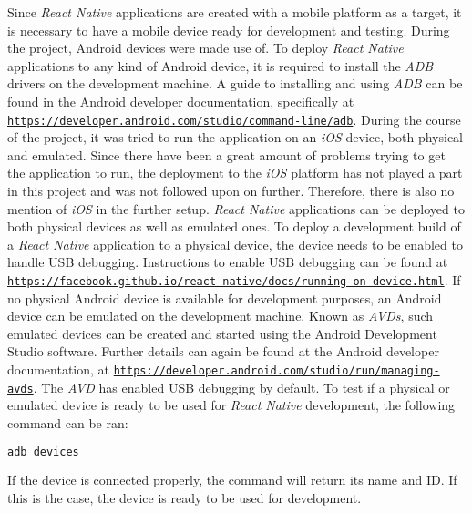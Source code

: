 Since \textit{React Native} applications are created with a mobile platform as a target, it is necessary to have a mobile device ready for development and testing. During the project, Android devices were made use of. To deploy \textit{React Native} applications to any kind of Android device, it is required to install the \textit{ADB} drivers on the development machine. A guide to installing and using \textit{ADB} can be found in the Android developer documentation, specifically at \href{https://developer.android.com/studio/command-line/adb}{\nolinkurl{https://developer.android.com/studio/command-line/adb}}.
\newline
During the course of the project, it was tried to run the application on an \textit{iOS} device, both physical and emulated. Since there have been a great amount of problems trying to get the application to run, the deployment to the \textit{iOS} platform has not played a part in this project and was not followed upon on further. Therefore, there is also no mention of \textit{iOS} in the further setup.
\newline
\textit{React Native} applications can be deployed to both physical devices as well as emulated ones. To deploy a development build of a \textit{React Native} application to a physical device, the device needs to be enabled to handle USB debugging. Instructions to enable USB debugging can be found at \href{https://facebook.github.io/react-native/docs/running-on-device.html}{\nolinkurl{https://facebook.github.io/react-native/docs/running-on-device.html}}.
\newline
If no physical Android device is available for development purposes, an Android device can be emulated on the development machine. Known as \textit{AVDs}, such emulated devices can be created and started using the Android Development Studio software. Further details can again be found at the Android developer documentation, at \href{https://developer.android.com/studio/run/managing-avds}{\nolinkurl{https://developer.android.com/studio/run/managing-avds}}. The \textit{AVD} has enabled USB debugging by default.
\newline
To test if a physical or emulated device is ready to be used for \textit{React Native} development, the following command can be ran:

\begin{lstlisting}[language=bash,caption=ADB Connection Test,label=adbTest]
adb devices
\end{lstlisting}

If the device is connected properly, the command will return its name and ID. If this is the case, the device is ready to be used for development.


